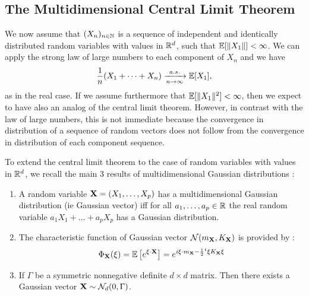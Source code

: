 \documentclass[../Main.tex]{subfiles}
\begin{document}
\subsection{The Multidimensional Central Limit Theorem}
We now assume that $(X_n)_{n \in \mathbb{N}}$ is a sequence of independent and identically distributed random variables with values in $\mathbb{R}^d$, such that $\mathbb{E}[\|X_1\|] < \infty$. We can apply the strong law of large numbers to each component of $X_n$ and we have
\[
\frac{1}{n}(X_1 + \cdots + X_n) \xrightarrow[n \to \infty]{a.s.} \mathbb{E}[X_1],
\]
as in the real case. If we assume furthermore that $\mathbb{E}[\|X_1\|^2] < \infty$, then we expect to have also an analog of the central limit theorem. However, in contrast with the law of large numbers, this is not immediate because the convergence in distribution of a sequence of random vectors does not follow from the convergence in distribution of each component sequence.

To extend the central limit theorem to the case of random variables with values in $\mathbb{R}^d$, we recall the main 3 results of multidimensional Gaussian distributions :
\begin{enumerate}
    \item A random variable $\mathbf{X}=(X_1,\ldots,X_p)$ has a multidimensional Gaussian distribution (ie Gaussian vector) iff for all $a_1,\ldots,a_p\in\mathbb{R}$ the real random variable $a_1X_1+\ldots+a_pX_p$ has a Gaussian distribution.
    \item The characteristic function of Gaussian vector $\mathcal{N}(m_{\mathbf{X}}, K_{\mathbf{X}})$ is provided by :
    \[ \Phi_{\mathbf{X}}(\xi) = \mathbb{E}\left[ e^{\xi\cdot \mathbf{X}} \right] = e^{i\xi\cdot m_{\mathbf{X}} -\frac{1}{2} {}^t\xi K_{\mathbf{X}} \xi}   \] 
    \item If $\Gamma$ be a symmetric nonnegative definite $d\times d$ matrix. Then there exists a Gaussian vector $\mathbf{X} \sim \mathcal{N}_d(0,\Gamma)$.
\end{enumerate}


\end{document}
